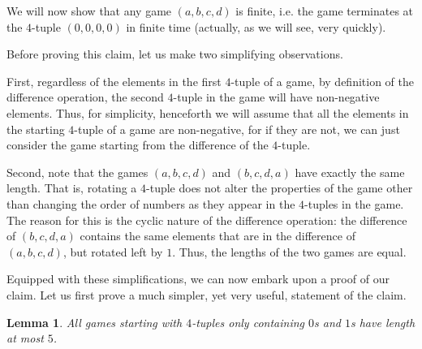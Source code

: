 \documentclass[12pt]{amsart}
\newtheorem{lemma}[theorem]{Lemma}
\begin{document}
We will now show that any game $(a,b,c,d)$ is finite, i.e. the game terminates at the $4$-tuple $(0,0,0,0)$ in finite time (actually, as we will see, very quickly).

Before proving this claim, let us make two simplifying observations.

First, regardless of the elements in the first $4$-tuple of a game, by definition of the difference operation, the second $4$-tuple in the game will have non-negative elements. Thus, for simplicity, henceforth we will assume that all the elements in the starting $4$-tuple of a game are non-negative, for if they are not, we can just consider the game starting from the difference of the $4$-tuple.

Second, note that the games $(a,b,c,d)$ and $(b,c,d,a)$ have exactly the same length. That is, rotating a $4$-tuple does not alter the properties of the game other than changing the order of numbers as they appear in the $4$-tuples in the game. The reason for this is the cyclic nature of the difference operation: the difference of $(b,c,d,a)$ contains the same elements that are in the difference of $(a,b,c,d)$, but rotated left by $1$. Thus, the lengths of the two games are equal.

Equipped with these simplifications, we can now embark upon a proof of our claim. Let us first prove a much simpler, yet very useful, statement of the claim.

\begin{lemma}
All games starting with $4$-tuples only containing $0$s and $1$s have length at most $5$.
\label{lem:zerosones}
\end{lemma}
\end{document}
